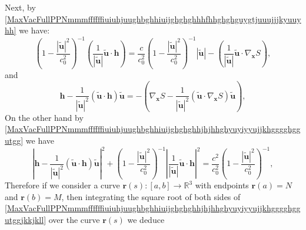 \documentclass{article}
\theoremstyle{definition}
\theoremstyle{remark}
\renewcommand{\vec}[1]{\mathbf{#1}}
\newcommand{\er}{\eqref}
\newcommand{\er}{\eqref}
\begin{document}
Next, by
\er{MaxVacFullPPNmmmffffffiuiuhjuughbghhiuijghghghhhfhhghghguygtjuuujjjkyuuyhh}
we have:
\begin{equation}\label{MaxVacFullPPNmmmffffffiuiuhjuughbghhiuijghghghhhfhhghghguygtjuuujjjkyuuyhhijhhhhjihhyjh}
\left(1-\frac{|\vec {\tilde
u}|^2}{c^2_0}\right)^{-1}\left(\frac{1}{|\vec {\tilde u}|}\vec
{\tilde u}\cdot\vec h\right)=\frac{c}{c^2_0}\left(1-\frac{|\vec
{\tilde u}|^2}{c^2_0}\right)^{-1}|\vec {\tilde
u}|-\left(\frac{1}{|\vec {\tilde u}|}\vec {\tilde
u}\cdot\nabla_{\vec x}S\right),
\end{equation}
and
\begin{equation}\label{MaxVacFullPPNmmmffffffiuiuhjuughbghhiuijghghghhhfhhghghguygtjuuujjjkyuuyhhijhhhhjjhjhj}
\vec h-\frac{1}{\left|\vec {\tilde u}\right|^2}\left(\vec {\tilde
u}\cdot\vec h\right)\vec {\tilde u}=-\left(\nabla_{\vec
x}S-\frac{1}{\left|\vec {\tilde u}\right|^2}\left(\vec {\tilde
u}\cdot\nabla_{\vec x}S\right)\vec {\tilde u}\right),
\end{equation}
On the other hand by
\er{MaxVacFullPPNmmmffffffiuiuhjuughbghhiuijghghghhjhjhhghyuyiyyujjkhgggghggutgg}
we have
\begin{equation}\label{MaxVacFullPPNmmmffffffiuiuhjuughbghhiuijghghghhjhjhhghyuyiyyujjkhgggghggutggjkkjkll}
\left|\vec h-\frac{1}{\left|\vec {\tilde u}\right|^2}\left(\vec
{\tilde u}\cdot\vec h\right)\vec {\tilde
u}\right|^2+\left(1-\frac{\left|\vec {\tilde
u}\right|^2}{c^2_0}\right)^{-1}\left|\frac{1}{\left|\vec {\tilde
u}\right|}\vec {\tilde u}\cdot\vec h\right|^2=
\frac{c^2}{c^2_0}\left(1-\frac{\left|\vec {\tilde
u}\right|^2}{c^2_0}\right)^{-1},
\end{equation}
Therefore if we consider a curve $\vec r(s):[a,b]\to\mathbb{R}^3$
with endpoints $\vec r(a)=N$ and $\vec r(b)=M$, then integrating the
square root of both sides of
\er{MaxVacFullPPNmmmffffffiuiuhjuughbghhiuijghghghhjhjhhghyuyiyyujjkhgggghggutggjkkjkll}
over the curve $\vec r(s)$ we deduce
\end{document}
